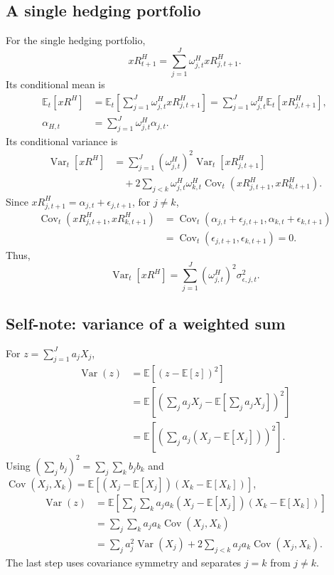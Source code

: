 \documentclass[11pt]{article}
\newcommand{\Et}{\mathbb{E}_t}
\newcommand{\Vt}{\operatorname{Var}_t}
\newcommand{\Ct}{\operatorname{Cov}_t}
\begin{document}
\subsection*{A single hedging portfolio}
For the single hedging portfolio,
\[
xR^H_{t+1}=\sum_{j=1}^J\omega^H_{j,t}xR^H_{j,t+1}.
\]
Its conditional mean is
\begin{align*}
\Et[xR^H]
&=\Et\left[\sum_{j=1}^J\omega^H_{j,t}xR^H_{j,t+1}\right]
=\sum_{j=1}^J\omega^H_{j,t}\Et[xR^H_{j,t+1}],\\
\alpha_{H,t}&=\sum_{j=1}^J\omega^H_{j,t}\alpha_{j,t}.
\end{align*}
Its conditional variance is
\begin{align*}
\Vt[xR^H]
&=\sum_{j=1}^J(\omega^H_{j,t})^2\Vt[xR^H_{j,t+1}]\\
&\quad+2\sum_{j<k}\omega^H_{j,t}\omega^H_{k,t}
\Ct(xR^H_{j,t+1},xR^H_{k,t+1}).
\end{align*}
Since $xR^H_{j,t+1}=\alpha_{j,t}+\epsilon_{j,t+1}$, for $j\ne k$,
\begin{align*}
\Ct(xR^H_{j,t+1},xR^H_{k,t+1})
&=\Ct(\alpha_{j,t}+\epsilon_{j,t+1},\alpha_{k,t}+\epsilon_{k,t+1})\\
&=\Ct(\epsilon_{j,t+1},\epsilon_{k,t+1})=0.
\end{align*}
Thus,
\[
\Vt[xR^H]=\sum_{j=1}^J(\omega^H_{j,t})^2\sigma^2_{\epsilon,j,t}.
\]
\clearpage
\subsection*{Self-note: variance of a weighted sum}
For $z=\sum_{j=1}^J a_jX_j$,
\begin{align*}
\operatorname{Var}(z)
&=\mathbb E[(z-\mathbb E[z])^2]\\
&=\mathbb E\left[\left(\sum_j a_jX_j-\mathbb E\left[\sum_j a_jX_j\right]\right)^2\right]\\
&=\mathbb E\left[\left(\sum_j a_j(X_j-\mathbb E[X_j])\right)^2\right].
\end{align*}
Using $(\sum_j b_j)^2=\sum_j\sum_k b_jb_k$ and
$\operatorname{Cov}(X_j,X_k)=\mathbb E[(X_j-\mathbb E[X_j])(X_k-\mathbb E[X_k])]$,
\begin{align*}
\operatorname{Var}(z)
&=\mathbb E\left[\sum_j\sum_k a_ja_k
(X_j-\mathbb E[X_j])(X_k-\mathbb E[X_k])\right]\\
&=\sum_j\sum_k a_ja_k\operatorname{Cov}(X_j,X_k)\\
&=\sum_j a_j^2\operatorname{Var}(X_j)
+2\sum_{j<k}a_ja_k\operatorname{Cov}(X_j,X_k).
\end{align*}
The last step uses covariance symmetry and separates $j=k$ from $j\ne k$.
\clearpage
\end{document}

